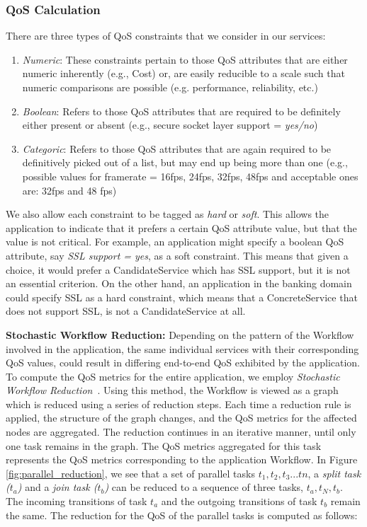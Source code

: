 \documentclass[10pt,journal,compsoc]{IEEEtran}
\begin{document}
\subsubsection{QoS Calculation}
There are three types of QoS constraints that we consider in our services:
	\begin{enumerate}
	    \item \textit{Numeric}: These constraints pertain to those QoS attributes that are either numeric inherently (e.g., Cost) or, are easily reducible to a scale such that numeric comparisons are possible (e.g. performance, reliability, etc.)
	    \item \textit{Boolean}: Refers to those QoS attributes that are required to be definitely either present or absent (e.g., secure socket layer support = \textit{yes/no})
	    \item \textit{Categoric}: Refers to those QoS attributes that are again required to be definitively picked out of a list, but may end up being more than one (e.g., possible values for framerate = 16fps, 24fps, 32fps, 48fps and acceptable ones are: 32fps and 48 fps) 
	\end{enumerate}
We also allow each constraint to be tagged as \textit{hard} or \textit{soft}. This allows the application to indicate that it prefers a certain QoS attribute value, but that the value is not critical. For example, an application might specify a boolean QoS attribute, say \textit{SSL support = yes}, as a soft constraint. This means that given a choice, it would prefer a CandidateService which has SSL support, but it is not an essential criterion. On the other hand, an application in the banking domain could specify SSL as a hard constraint, which means that a ConcreteService that does not support SSL, is not a CandidateService at all.

\textbf{Stochastic Workflow Reduction\label{swr}:} Depending on the pattern of the Workflow involved in the application, the same individual services with their corresponding QoS values, could result in differing end-to-end QoS exhibited by the application. To compute the QoS metrics for the entire application, we employ \textit{Stochastic Workflow Reduction}~\cite{Cardoso2002Workflow}. Using this method, the Workflow is viewed as a graph which is reduced using a series of reduction steps. Each time a reduction rule is applied, the structure of the graph changes, and the QoS metrics for the affected nodes are aggregated. The reduction continues in an iterative manner, until only one task remains in the graph. The QoS metrics aggregated for this task represents the QoS metrics corresponding to the application Workflow. In Figure \ref{fig:parallel_reduction}, we see that a set of parallel tasks $t_{1}, t_{2}, t_{3}...t{n}$, a \textit{split task ($t_{a}$)} and a \textit{join task ($t_{b}$)} can be reduced to a sequence of three tasks, $t_{a}, t_{N}, t_{b}$. The incoming transitions of task $t_{a}$ and the outgoing transitions of task $t_{b}$ remain the same. The reduction for the QoS of the parallel tasks is computed as follows:
\end{document}
